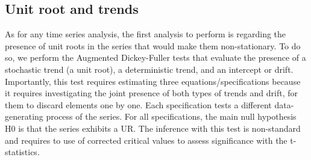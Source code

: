 \documentclass[hidelinks,12pts]{article}
\DeclareMathOperator{\1}{\mathbbm{1}}
\begin{document}

\subsection{Unit root and trends}

As for any time series analysis, the first analysis to perform is regarding the presence of unit roots in the series that would make them non-stationary. 
To do so, we perform the Augmented Dickey-Fuller tests that evaluate the presence of a stochastic trend (a unit root), a deterministic trend, and an intercept or drift. 
Importantly, this test requires estimating three equations/specifications because it requires investigating the joint presence of both types of trends and drift, for them to discard elements one by one.
Each specification tests a different data-generating process of the series. 
For all specifications, the main null hypothesis H0 is that the series exhibits a UR. 
The inference with this test is non-standard and requires to use of corrected critical values to assess significance with the t-statistics. 
\end{document}
